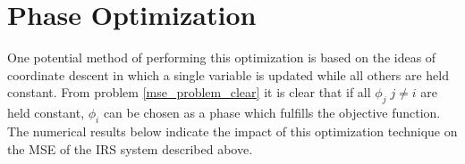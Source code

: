 \documentclass[12pt,a4paper]{report}
\begin{document}
\section{Phase Optimization}
One potential method of performing this optimization is based on the ideas of coordinate descent in which a single variable is updated while all others are held constant.
From problem \eqref{mse_problem_clear} it is clear that if all $\phi_{j} \; j \neq i $ are held constant, $\phi_{i}$ can be chosen as a phase which fulfills the objective function. The numerical results below indicate the impact of this optimization technique on the MSE of the IRS system described above. 

\end{document}
